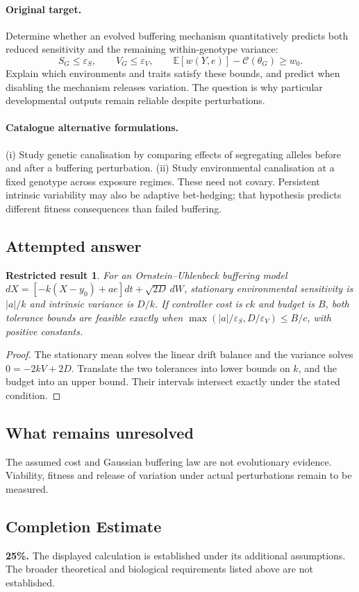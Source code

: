 \documentclass[11pt]{article}
\newcommand{\E}{\mathbb E}
\providecommand{\E}{\mathbb E}
\newtheorem{attemptresult}{Restricted result}[section]
\begin{document}
\paragraph{Original target.}
Determine whether an evolved buffering mechanism quantitatively predicts both reduced sensitivity and the remaining within-genotype variance:
\[
S_G\leq\varepsilon_S,\qquad V_G\leq\varepsilon_V,
\qquad
\E[w(Y,e)]-\mathcal C(\theta_G)\geq w_0.
\]
Explain which environments and traits satisfy these bounds, and predict when disabling the mechanism releases variation. The question is why particular developmental outputs remain reliable despite perturbations.
\paragraph{Catalogue alternative formulations.}
(i) Study genetic canalisation by comparing effects of segregating alleles before and after a buffering perturbation. (ii) Study environmental canalisation at a fixed genotype across exposure regimes. These need not covary. Persistent intrinsic variability may also be adaptive bet-hedging; that hypothesis predicts different fitness consequences than failed buffering.
\subsection{Attempted answer}
\begin{attemptresult}
For an Ornstein--Uhlenbeck buffering model $dX=[-k(X-y_0)+ae]dt+\sqrt{2D}\,dW$, stationary environmental sensitivity is $|a|/k$ and intrinsic variance is $D/k$. If controller cost is $ck$ and budget is $B$, both tolerance bounds are feasible exactly when $\max(|a|/\varepsilon_S,D/\varepsilon_V)\leq B/c$, with positive constants.
\end{attemptresult}
\begin{proof}
The stationary mean solves the linear drift balance and the variance solves $0=-2kV+2D$. Translate the two tolerances into lower bounds on $k$, and the budget into an upper bound. Their intervals intersect exactly under the stated condition.
\end{proof}
\subsection{What remains unresolved}
The assumed cost and Gaussian buffering law are not evolutionary evidence. Viability, fitness and release of variation under actual perturbations remain to be measured.
\subsection{Completion Estimate}
\textbf{25\%.} The displayed calculation is established under its additional assumptions. The broader theoretical and biological requirements listed above are not established.
\end{document}
